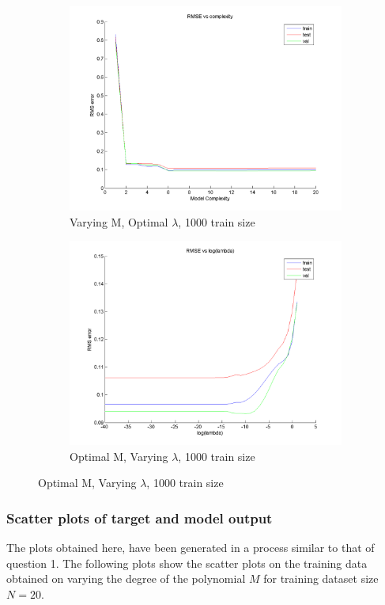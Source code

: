 \documentclass{article}
\begin{document}
\begin{figure}[H]
\begin{subfigure}{.5\textwidth}
\centering
\includegraphics[width=\linewidth]{RMS_complexity_1000}
\caption{Varying M, Optimal $\lambda$, 1000 train size}
\end{subfigure}
\begin{subfigure}{.5\textwidth}
\includegraphics[width=\linewidth]{RMS_lambda_1000}
\caption{Optimal M, Varying $\lambda$, 1000 train size}
\end{subfigure}

\end{figure}

\subsubsection{Scatter plots of target and model output}
The plots obtained here, have been generated in a process similar to that of question 1. 
The following plots show the scatter plots on the training data obtained on varying the degree of the polynomial $M$ for training dataset size $N = 20$.
\end{document}
